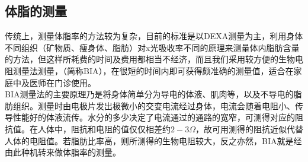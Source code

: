 \documentclass[16pt,a4paper]{article}
\begin{document}
\subsection{体脂的测量}
传统上，测量体脂率的方法较为复杂，目前的标准是以DEXA测量为主，利用身体不同组织（矿物质、瘦身体、脂肪）对x光吸收率不同的原理来测量体内脂肪含量的方法，但这样所耗费的时间及费用都相当不经济，而且我们采用较方便的生物电阻测量法测量，（简称BIA），在很短的时间内即可获得颇准确的测量值，适合在家庭中及医师在门诊使用。 \\
BIA测量法的主要原理乃是将身体简单分为导电的体液、肌肉等，以及不导电的脂肪组织。测量时由电极片发出极微小的交变电流经过身体，电流会随着电阻小、传导性能好的体液流传。水分的多少决定了电流通过的通路的宽窄，可测得对应的阻抗值。在人体中，阻抗和电阻的值仅仅相差约$2-3\Omega$，故可用测得的阻抗近似代替人体的电阻值。若脂肪比率高，则所测得的生物电阻较大，反之亦然，BIA就是经由此种机转来做体脂率的测量。
\end{document}
